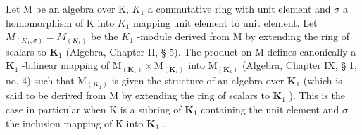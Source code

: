 Let M be an algebra over K, \(K_{1}\) a commutative ring with unit element and \(\sigma\) a homomorphism of K into \(K_{1}\) mapping unit element to unit element. Let \(M_{(K_{1},\sigma)} = M_{(K_{1})}\) be the \(K_{1}\) -module derived from M by extending the ring of scalars to \(\mathbf{K}_1\) (Algebra, Chapter II, § 5). The product on M defines canonically a \(\mathbf{K}_1\) -bilinear mapping of \(\mathrm{M}_{(\mathbf{K}_1)} \times \mathrm{M}_{(\mathbf{K}_1)}\) into \(\mathrm{M}_{(\mathbf{K}_1)}\) (Algebra, Chapter IX, § 1, no. 4) such that \(\mathrm{M}_{(\mathbf{K}_1)}\) is given the structure of an algebra over \(\mathbf{K}_1\) (which is said to be derived from M by extending the ring of scalars to \(\mathbf{K}_1\) ). This is the case in particular when K is a subring of \(\mathbf{K}_1\) containing the unit element and \(\sigma\) the inclusion mapping of K into \(\mathbf{K}_1\) .

